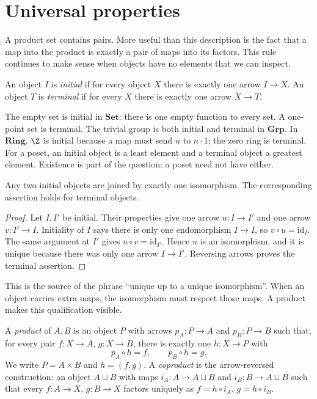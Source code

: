 \section{Universal properties}

A product set contains pairs. More useful than this description is the fact that a map into the product is exactly a pair of maps into its factors. This rule continues to make sense when objects have no elements that we can inspect.

\begin{definition}\label{def:initial}
An object $I$ is \emph{initial} if for every object $X$ there is exactly one arrow $I\to X$. An object $T$ is \emph{terminal} if for every $X$ there is exactly one arrow $X\to T$.
\end{definition}

The empty set is initial in $\mathbf{Set}$: there is one empty function to every set. A one-point set is terminal. The trivial group is both initial and terminal in $\mathbf{Grp}$. In $\mathbf{Ring}$, $\Z$ is initial because a map must send $n$ to $n\cdot1$; the zero ring is terminal. For a poset, an initial object is a least element and a terminal object a greatest element. Existence is part of the question: a poset need not have either.

\begin{proposition}\label{prop:initialunique}
Any two initial objects are joined by exactly one isomorphism. The corresponding assertion holds for terminal objects.
\end{proposition}

\begin{proof}
Let $I,I'$ be initial. Their properties give one arrow $u:I\to I'$ and one arrow $v:I'\to I$. Initiality of $I$ says there is only one endomorphism $I\to I$, so $v\circ u=\mathrm{id}_I$. The same argument at $I'$ gives $u\circ v=\mathrm{id}_{I'}$. Hence $u$ is an isomorphism, and it is unique because there was only one arrow $I\to I'$. Reversing arrows proves the terminal assertion.
\end{proof}

This is the source of the phrase ``unique up to a unique isomorphism''. When an object carries extra maps, the isomorphism must respect those maps. A product makes this qualification visible.

\begin{definition}\label{def:product}
A \emph{product} of $A,B$ is an object $P$ with arrows $p_A:P\to A$ and $p_B:P\to B$ such that, for every pair $f:X\to A$, $g:X\to B$, there is exactly one $h:X\to P$ with
\[
p_A\circ h=f,\qquad p_B\circ h=g.
\]
We write $P=A\times B$ and $h=(f,g)$. A \emph{coproduct} is the arrow-reversed construction: an object $A\sqcup B$ with maps $i_A:A\to A\sqcup B$ and $i_B:B\to A\sqcup B$ such that every $f:A\to X$, $g:B\to X$ factors uniquely as $f=h\circ i_A$, $g=h\circ i_B$.
\end{definition}

